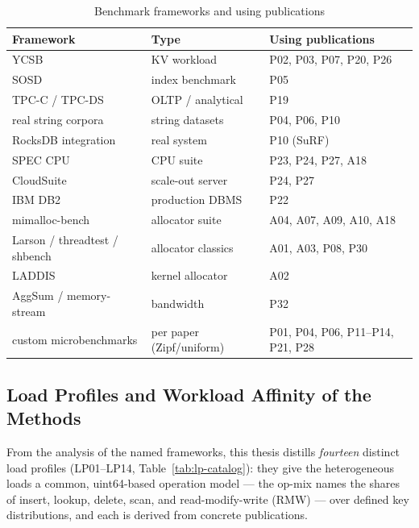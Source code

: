 \begin{table}[!htbp]
  \caption{Benchmark frameworks and using publications}\label{tab:wl-frameworks}
  \centering\footnotesize
  \begin{tabular}{@{}p{3.2cm} p{2.8cm} p{6cm}@{}}
    \toprule
    \textbf{Framework} & \textbf{Type} & \textbf{Using publications} \\
    \midrule
    YCSB~\cite{cooper2010ycsb} & KV workload & P02, P03, P07, P20, P26 \\
    SOSD~\cite{kipf2019sosd} & index benchmark & P05 \\
    TPC-C / TPC-DS~\cite{tpc_benchmarks} & OLTP / analytical & P19 \\
    real string corpora & string datasets & P04, P06, P10 \\
    RocksDB integration & real system & P10 (SuRF) \\
    SPEC CPU~\cite{spec_cpu2017} & CPU suite & P23, P24, P27, A18 \\
    CloudSuite~\cite{ferdman2012cloudsuite} & scale-out server & P24, P27 \\
    IBM DB2 & production DBMS & P22 \\
    mimalloc-bench~\cite{mimalloc_bench} & allocator suite & A04, A07, A09, A10, A18 \\
    Larson / threadtest / shbench & allocator classics & A01, A03, P08, P30 \\
    LADDIS & kernel allocator & A02 \\
    AggSum / memory-stream & bandwidth & P32 \\
    custom microbenchmarks & per paper (Zipf/uniform) & P01, P04, P06, P11--P14, P21, P28 \\
    \bottomrule
  \end{tabular}
\end{table}

\subsection{Load Profiles and Workload Affinity of the Methods}\label{ssec:sota-wl-profiles}
From the analysis of the named frameworks, this thesis distills \emph{fourteen} distinct load
profiles (LP01--LP14, Table~\ref{tab:lp-catalog}): they give the heterogeneous loads a common,
uint64-based operation model --- the op-mix names the shares of insert, lookup, delete, scan, and
read-modify-write (RMW) --- over defined key distributions, and each is derived from concrete
publications.

